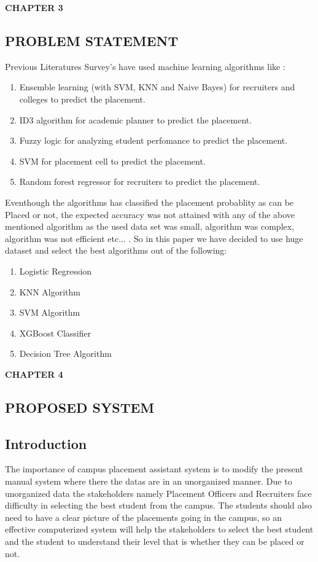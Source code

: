\documentclass[12pt]{article}
\begin{document}
\begin{flushleft}\textbf{CHAPTER 3} \end{flushleft}
\begin{flushleft}\section{PROBLEM STATEMENT} \end{flushleft}
Previous Literatures Survey's have used machine learning algorithms like :
\begin{enumerate}
\item Ensemble learning (with SVM, KNN and Naive Bayes) for recruiters and colleges to predict the placement.
\item ID3 algorithm for academic planner to predict the placement.
\item Fuzzy logic for analyzing student perfomance to predict the placement.
\item SVM for placement cell to predict the placement.
\item Random forest regressor for recruiters to predict the placement.
\end{enumerate}
Eventhough the algorithms has classified the placement probablity as can be Placed or not, the expected accuracy was not attained with any of the above mentioned algorithm as the used data set was small, algorithm was complex, algorithm was not efficient etc... . 
So in this paper we have decided to use huge dataset and select the best algorithms out of the following:
\begin{enumerate}
\item Logistic Regression
\item KNN Algorithm
\item SVM Algorithm
\item XGBoost Classifier
\item Decision Tree Algorithm
\end{enumerate}
\newpage
\begin{flushleft}\textbf{CHAPTER 4} \end{flushleft}
\begin{flushleft}\section{PROPOSED SYSTEM} \end{flushleft}
\subsection{Introduction}
The importance of campus placement assistant system is to modify the present 
manual system where there the datas are in an unorganized manner. Due to unorganized data the stakeholders namely Placement Officers and Recruiters face difficulty in selecting the best student from the campus. The students should also need to have a clear picture of the placements going in the campus, so an effective computerized system will help the stakeholders to select the best student and the student to understand their level that is whether they can be placed or not.
\end{document}
